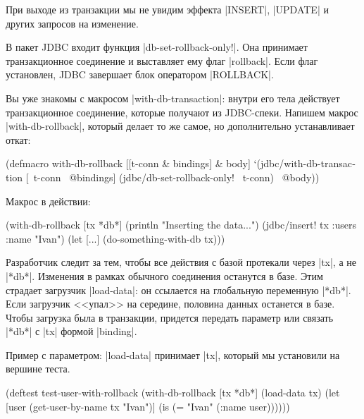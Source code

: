 При выходе из транзакции мы не увидим эффекта \spverb|INSERT|, \spverb|UPDATE| и
других запросов на изменение.

В пакет JDBC входит функция \spverb|db-set-rollback-only!|. Она принимает
транзакционное соединение и выставляет ему флаг \spverb|rollback|. Если флаг
установлен, JDBC завершает блок оператором \spverb|ROLLBACK|.

Вы уже знакомы с макросом \spverb|with-db-transaction|: внутри его тела
действует транзакционное соединение, которые получают из JDBC-спеки. Напишем
макрос \spverb|with-db-rollback|, который делает то же самое, но дополнительно
устанавливает откат:

\begin{english}
  \begin{clojure}
(defmacro with-db-rollback
  [[t-conn & bindings] & body]
  `(jdbc/with-db-transaction [~t-conn ~@bindings]
     (jdbc/db-set-rollback-only! ~t-conn)
     ~@body))
  \end{clojure}
\end{english}

Макрос в действии:

\begin{english}
  \begin{clojure}
(with-db-rollback [tx *db*]
  (println "Inserting the data...")
  (jdbc/insert! tx :users {:name "Ivan"})
  (let [...]
    (do-something-with-db tx)))
  \end{clojure}
\end{english}

Разработчик следит за тем, чтобы все действия с базой протекали через
\spverb|tx|, а не \spverb|*db*|. Изменения в рамках обычного соединения
останутся в базе. Этим страдает загрузчик \spverb|load-data|: он ссылается на
глобальную переменную \spverb|*db*|. Если загрузчик <<упал>> на середине,
половина данных останется в базе. Чтобы загрузка была в транзакции, придется
передать параметр или связать \spverb|*db*| с \spverb|tx| формой
\spverb|binding|.

Пример с параметром: \spverb|load-data| принимает \spverb|tx|, который мы
установили на вершине теста.

\begin{english}
  \begin{clojure}
(deftest test-user-with-rollback
  (with-db-rollback [tx *db*]
    (load-data tx)
    (let [user (get-user-by-name tx "Ivan")]
      (is (= "Ivan" (:name user))))))
  \end{clojure}
\end{english}

